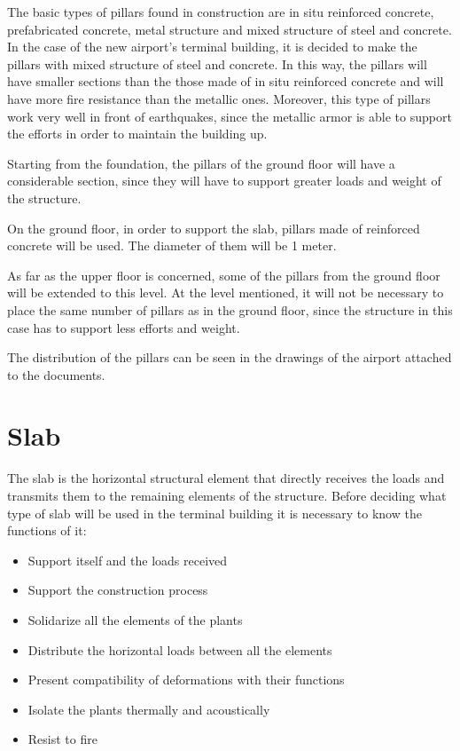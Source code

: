 The basic types of pillars found in construction are in situ reinforced concrete, prefabricated concrete, metal structure and mixed structure of steel and concrete. In the case of the new airport's terminal building, it is decided to make the pillars with mixed structure of steel and concrete. In this way, the pillars will have smaller sections than the those made of in situ reinforced concrete and will have more fire resistance than the metallic ones. Moreover, this type of pillars work very well in front of earthquakes, since the metallic armor is able to support the efforts in order to maintain the building up.

Starting from the foundation, the pillars of the ground floor will have a considerable section, since they will have to support greater loads and  weight of the structure.

On the ground floor, in order to support the slab, pillars made of reinforced concrete will be used. The diameter of them will be 1 meter.

As far as the upper floor is concerned, some of the pillars from the ground floor will be extended to this level. At the level mentioned, it will not be necessary to place the same number of pillars as in the ground floor, since the structure in this case has to support less efforts and weight.

The distribution of the pillars can be seen in the drawings of the airport attached to the documents.

	\section{Slab}
The slab is the horizontal structural element that directly receives the loads and transmits them to the remaining elements of the structure. Before deciding what type of slab will be used in the terminal building it is necessary to know the
functions of it:

\begin{itemize}
		\item Support itself and the loads received
		\item Support the construction process
		\item Solidarize all the elements of the plants
		\item Distribute the horizontal loads between all the elements
		\item Present compatibility of deformations with their functions
		\item Isolate the plants thermally and acoustically
		\item Resist to fire
\end{itemize}

